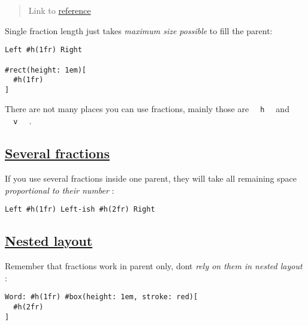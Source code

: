 \begin{quote}
Link to
\href{https://typst.app/docs/reference/layout/fraction/}{reference}
\end{quote}

Single fraction length just takes \emph{maximum size possible} to fill
the parent:

\begin{verbatim}
Left #h(1fr) Right

#rect(height: 1em)[
  #h(1fr)
]
\end{verbatim}

\pandocbounded{}

There are not many places you can use fractions, mainly those are
\texttt{\ }{\texttt{\ h\ }}\texttt{\ } and
\texttt{\ }{\texttt{\ v\ }}\texttt{\ } .

\subsection{\texorpdfstring{\hyperref[several-fractions]{Several
fractions}}{Several fractions}}\label{several-fractions}

If you use several fractions inside one parent, they will take all
remaining space \emph{proportional to their number} :

\begin{verbatim}
Left #h(1fr) Left-ish #h(2fr) Right
\end{verbatim}

\pandocbounded{}

\subsection{\texorpdfstring{\hyperref[nested-layout]{Nested
layout}}{Nested layout}}\label{nested-layout}

Remember that fractions work in parent only, don\textquotesingle t
\emph{rely on them in nested layout} :

\begin{verbatim}
Word: #h(1fr) #box(height: 1em, stroke: red)[
  #h(2fr)
]
\end{verbatim}

\pandocbounded{}


